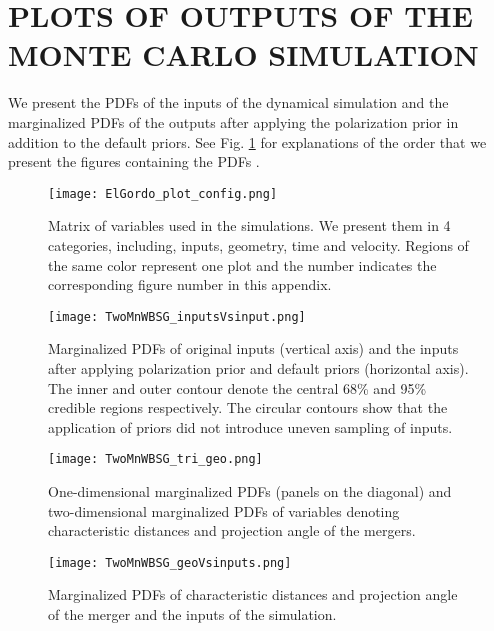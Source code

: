 \section{PLOTS OF OUTPUTS OF THE MONTE CARLO SIMULATION}
We present the PDFs of the inputs of the dynamical simulation and the
marginalized PDFs of the outputs after applying the polarization prior in
addition to the default priors. See Fig. \ref{fig:plot_config} for explanations of
the order that we present the figures containing the PDFs . 
\begin{figure}
	\begin{center}
	\texttt{[image: ElGordo\_plot\_config.png]}
	\end{center}
	\caption{Matrix of variables used in the simulations. We present them in
	4 categories, including, inputs, geometry, time and velocity. Regions of
	the same color represent one plot and the number
indicates the corresponding figure number in this appendix.
\label{fig:plot_config}
}
\end{figure}
\label{app:results}
\clearpage
\begin{figure*}
	\begin{minipage}{180mm}
	\begin{center}
	\texttt{[image: TwoMnWBSG\_inputsVsinput.png]}
	\caption{Marginalized PDFs of original inputs (vertical axis) and the inputs after
applying polarization prior and default priors (horizontal axis). The inner and outer contour
denote the central 68\% and 95\% credible regions respectively.
The circular contours show that the application of priors did not introduce
uneven sampling of inputs. }
	\end{center}
	\end{minipage}
\end{figure*}
\begin{figure*}
\begin{minipage}{180mm}
	\begin{center}
	\texttt{[image: TwoMnWBSG\_tri\_geo.png]}
	\caption{One-dimensional marginalized PDFs (panels on the diagonal) and
		two-dimensional marginalized PDFs of variables
		denoting characteristic distances and projection angle of the mergers.
	\label{fig:geom_geom}
	}
	\end{center}
	\end{minipage}
\end{figure*}
\begin{figure*}
\begin{minipage}{180mm}
	\begin{center}
	\texttt{[image: TwoMnWBSG\_geoVsinputs.png]}
	\caption{Marginalized PDFs of characteristic distances and projection
		angle of the merger and the inputs of the simulation.}
	\end{center}
	\end{minipage}
\end{figure*}
